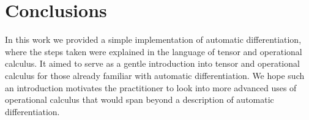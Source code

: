 \section{Conclusions}

In this work we provided a simple implementation of automatic differentiation, where the steps taken were explained in the language of tensor and operational calculus. It aimed to serve as a gentle introduction into tensor and operational calculus for those already familiar with automatic differentiation.
We hope such an introduction motivates the practitioner to look into more advanced uses of operational calculus that would span beyond a description of automatic differentiation.
